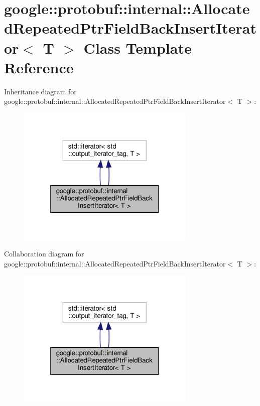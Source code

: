 \hypertarget{classgoogle_1_1protobuf_1_1internal_1_1AllocatedRepeatedPtrFieldBackInsertIterator}{}\section{google\+:\+:protobuf\+:\+:internal\+:\+:Allocated\+Repeated\+Ptr\+Field\+Back\+Insert\+Iterator$<$ T $>$ Class Template Reference}
\label{classgoogle_1_1protobuf_1_1internal_1_1AllocatedRepeatedPtrFieldBackInsertIterator}


Inheritance diagram for google\+:\+:protobuf\+:\+:internal\+:\+:Allocated\+Repeated\+Ptr\+Field\+Back\+Insert\+Iterator$<$ T $>$\+:
\nopagebreak
\begin{figure}[H]
\begin{center}
\leavevmode
\includegraphics[width=241pt]{classgoogle_1_1protobuf_1_1internal_1_1AllocatedRepeatedPtrFieldBackInsertIterator__inherit__graph}
\end{center}
\end{figure}


Collaboration diagram for google\+:\+:protobuf\+:\+:internal\+:\+:Allocated\+Repeated\+Ptr\+Field\+Back\+Insert\+Iterator$<$ T $>$\+:
\nopagebreak
\begin{figure}[H]
\begin{center}
\leavevmode
\includegraphics[width=241pt]{classgoogle_1_1protobuf_1_1internal_1_1AllocatedRepeatedPtrFieldBackInsertIterator__coll__graph}
\end{center}
\end{figure}

